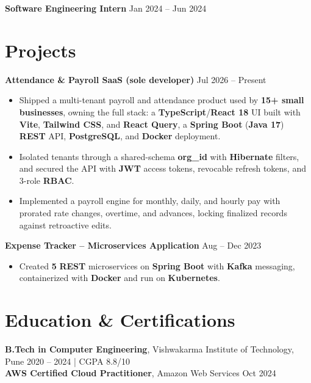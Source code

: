 \documentclass[a4paper,10pt]{article}
\begin{document}
\textbf{Software Engineering Intern} \hfill Jan 2024 -- Jun 2024

\section*{Projects}

\textbf{Attendance \& Payroll SaaS (sole developer)} \hfill Jul 2026 -- Present
\begin{itemize}[leftmargin=*]
    \item Shipped a multi-tenant payroll and attendance product used by \textbf{15+ small businesses}, owning the full stack: a \textbf{TypeScript}/\textbf{React 18} UI built with \textbf{Vite}, \textbf{Tailwind CSS}, and \textbf{React Query}, a \textbf{Spring Boot} (\textbf{Java 17}) \textbf{REST} API, \textbf{PostgreSQL}, and \textbf{Docker} deployment.
    \item Isolated tenants through a shared-schema \textbf{org\_id} with \textbf{Hibernate} filters, and secured the API with \textbf{JWT} access tokens, revocable refresh tokens, and 3-role \textbf{RBAC}.
    \item Implemented a payroll engine for monthly, daily, and hourly pay with prorated rate changes, overtime, and advances, locking finalized records against retroactive edits.
\end{itemize}

\noindent\textbf{Expense Tracker -- Microservices Application} \hfill Aug -- Dec 2023
\begin{itemize}[leftmargin=*]
    \item Created \textbf{5} \textbf{REST} microservices on \textbf{Spring Boot} with \textbf{Kafka} messaging, containerized with \textbf{Docker} and run on \textbf{Kubernetes}.
\end{itemize}

\section*{Education \& Certifications}
\textbf{B.Tech in Computer Engineering}, Vishwakarma Institute of Technology, Pune \hfill 2020 -- 2024 \;|\; CGPA 8.8/10 \\
\textbf{AWS Certified Cloud Practitioner}, Amazon Web Services \hfill Oct 2024
\end{document}
